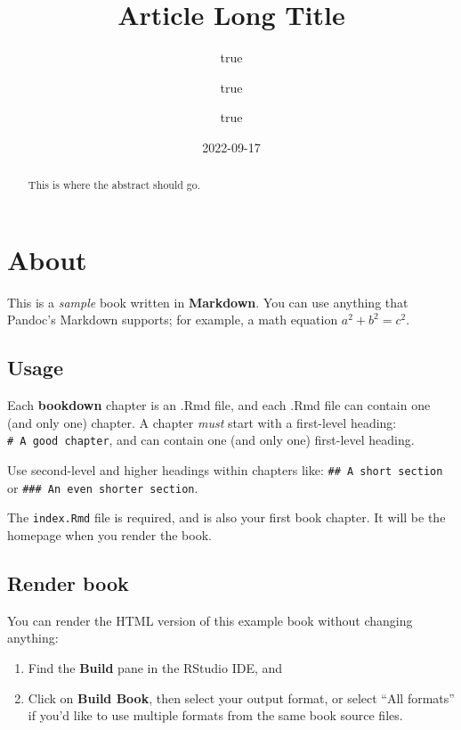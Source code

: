 \documentclass[
]{article}
\title{Article Long Title}
\author{true \and true \and true}
\date{2022-09-17}
\begin{document}
\maketitle
\begin{abstract}
This is where the abstract should go.
\end{abstract}

{
\setcounter{tocdepth}{2}
\tableofcontents
}
\hypertarget{about}{%
\section{About}\label{about}}

This is a \emph{sample} book written in \textbf{Markdown}. You can use anything that Pandoc's Markdown supports; for example, a math equation \(a^2 + b^2 = c^2\).

\hypertarget{usage}{%
\subsection{Usage}\label{usage}}

Each \textbf{bookdown} chapter is an .Rmd file, and each .Rmd file can contain one (and only one) chapter. A chapter \emph{must} start with a first-level heading: \texttt{\#\ A\ good\ chapter}, and can contain one (and only one) first-level heading.

Use second-level and higher headings within chapters like: \texttt{\#\#\ A\ short\ section} or \texttt{\#\#\#\ An\ even\ shorter\ section}.

The \texttt{index.Rmd} file is required, and is also your first book chapter. It will be the homepage when you render the book.

\hypertarget{render-book}{%
\subsection{Render book}\label{render-book}}

You can render the HTML version of this example book without changing anything:

\begin{enumerate}
\def\labelenumi{\arabic{enumi}.}
\item
  Find the \textbf{Build} pane in the RStudio IDE, and
\item
  Click on \textbf{Build Book}, then select your output format, or select ``All formats'' if you'd like to use multiple formats from the same book source files.
\end{enumerate}
\end{document}
